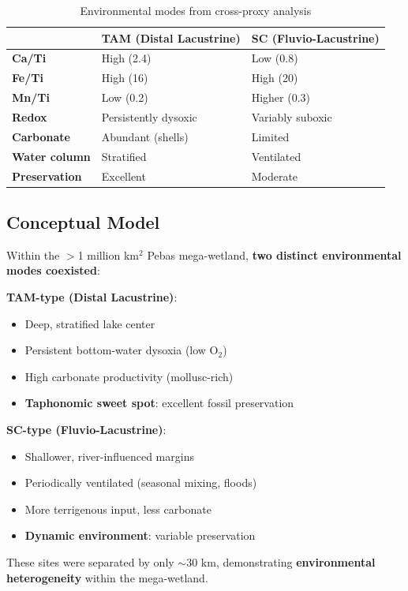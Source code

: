\documentclass[11pt,a4paper]{article}
\begin{document}
\begin{table}[H]
\centering
\caption{Environmental modes from cross-proxy analysis}
\begin{tabular}{lll}
\toprule
& \textbf{TAM (Distal Lacustrine)} & \textbf{SC (Fluvio-Lacustrine)} \\
\midrule
\textbf{Ca/Ti} & High (2.4) & Low (0.8) \\
\textbf{Fe/Ti} & High (16) & High (20) \\
\textbf{Mn/Ti} & Low (0.2) & Higher (0.3) \\
\midrule
\textbf{Redox} & Persistently dysoxic & Variably suboxic \\
\textbf{Carbonate} & Abundant (shells) & Limited \\
\textbf{Water column} & Stratified & Ventilated \\
\textbf{Preservation} & Excellent & Moderate \\
\bottomrule
\end{tabular}
\end{table}

\subsection{Conceptual Model}

\begin{tcolorbox}[colback=green!5, colframe=green!50!black, title=Pebas Mega-Wetland: Spatial Heterogeneity]
Within the $>$1 million km$^2$ Pebas mega-wetland, \textbf{two distinct environmental modes coexisted}:

\textbf{\textcolor{TAMcolor}{TAM-type (Distal Lacustrine)}}:
\begin{itemize}[noitemsep]
    \item Deep, stratified lake center
    \item Persistent bottom-water dysoxia (low O$_2$)
    \item High carbonate productivity (mollusc-rich)
    \item \textbf{Taphonomic sweet spot}: excellent fossil preservation
\end{itemize}

\textbf{\textcolor{SCcolor}{SC-type (Fluvio-Lacustrine)}}:
\begin{itemize}[noitemsep]
    \item Shallower, river-influenced margins
    \item Periodically ventilated (seasonal mixing, floods)
    \item More terrigenous input, less carbonate
    \item \textbf{Dynamic environment}: variable preservation
\end{itemize}

These sites were separated by only $\sim$30 km, demonstrating \textbf{environmental heterogeneity} within the mega-wetland.
\end{tcolorbox}
\end{document}
